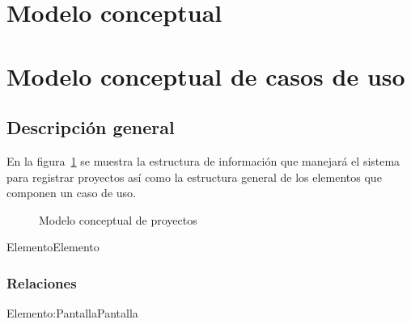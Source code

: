 \section{Modelo conceptual}
\section{Modelo conceptual de casos de uso}

\subsection{Descripción general}
 En la figura~\ref{fig:conceptualProyectos} se muestra la estructura de información que manejará el sistema para registrar proyectos así como la estructura general de los elementos que componen un caso de uso.
 
\begin{figure}[htbp!]
	\begin{center}
		\caption{Modelo conceptual de proyectos}
		\label{fig:conceptualProyectos}
	\end{center}
\end{figure}

\begin{BusinessEntity}{Elemento}{Elemento}
\end{BusinessEntity}

\subsubsection{Relaciones}

\begin{BusinessFact}{Elemento:Pantalla}{Pantalla}
\end{BusinessFact}

